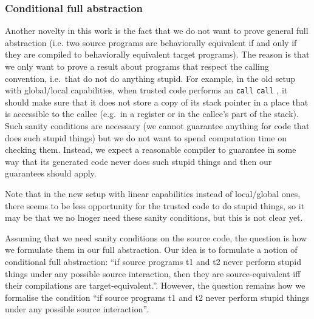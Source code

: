 \documentclass[a4paper]{article}
\newcommand{\sourcecolor}{\color{blue}}
\newcommand{\src}[1]{{\sourcecolor #1}}
\newcommand{\zinstr}[1]{\texttt{#1}}
\newcommand{\twoinstr}[3]{
  \ifthenelse{\equal{#2#3}{}}
  {\zinstr{#1}}
  {\zinstr{#1} \; #2 \; #3}
}
\newcommand{\scall}[2]{\twoinstr{\src{call}}{#1}{#2}}
\begin{document}
\subsubsection{Conditional full abstraction}
\label{sec:conditional-full-abstraction}

Another novelty in this work is the fact that we do not want to prove general full abstraction (i.e. two source programs are behaviorally equivalent if and only if they are compiled to behaviorally equivalent target programs).
The reason is that we only want to prove a result about programs that respect the calling convention, i.e.\ that do not do anything stupid.
For example, in the old setup with global/local capabilities, when trusted code performs an \scall{}{}, it should make sure that it does not store a copy of its stack pointer in a place that is accessible to the callee (e.g.\ in a register or in the callee's part of the stack).
Such sanity conditions are necessary (we cannot guarantee anything for code that does such stupid things) but we do not want to spend computation time on checking them.
Instead, we expect a reasonable compiler to guarantee in some way that its generated code never does such stupid things and then our guarantees should apply.

Note that in the new setup with linear capabilities instead of local/global ones, there seems to be less opportunity for the trusted code to do stupid things, so it may be that we no lnoger need these sanity conditions, but this is not clear yet.

Assuming that we need sanity conditions on the source code, the question is how we formulate them in our full abstraction.
Our idea is to formulate a notion of conditional full abstraction: ``if source programs t1 and t2 never perform stupid things under any possible source interaction, then they are source-equivalent iff their compilations are target-equivalent.''.
However, the question remains how we formalise the condition ``if source programs t1 and t2 never perform stupid things under any possible source interaction''.
\end{document}
